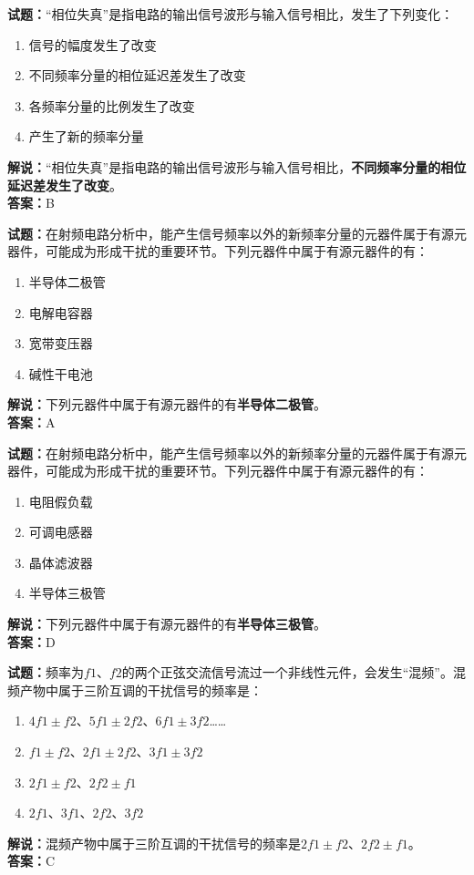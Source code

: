 \documentclass{ctexbook}
\begin{document}

\bigskip


\noindent\textbf{试题：}“相位失真”是指电路的输出信号波形与输入信号相比，发生了下列变化：
\begin{enumerate}[leftmargin=3em]
\item 信号的幅度发生了改变
\item 不同频率分量的相位延迟差发生了改变
\item 各频率分量的比例发生了改变
\item 产生了新的频率分量
\end{enumerate}
\noindent\textbf{解说：}“相位失真”是指电路的输出信号波形与输入信号相比，\textbf{不同频率分量的相位延迟差发生了改变}。\\\noindent\textbf{答案：}B



\bigskip


\noindent\textbf{试题：}在射频电路分析中，能产生信号频率以外的新频率分量的元器件属于有源元器件，可能成为形成干扰的重要环节。下列元器件中属于有源元器件的有：
\begin{enumerate}[leftmargin=3em]
\item 半导体二极管
\item 电解电容器
\item 宽带变压器
\item 碱性干电池
\end{enumerate}
\noindent\textbf{解说：}下列元器件中属于有源元器件的有\textbf{半导体二极管}。\\\noindent\textbf{答案：}A



\bigskip


\noindent\textbf{试题：}在射频电路分析中，能产生信号频率以外的新频率分量的元器件属于有源元器件，可能成为形成干扰的重要环节。下列元器件中属于有源元器件的有：
\begin{enumerate}[leftmargin=3em]
\item 电阻假负载
\item 可调电感器
\item 晶体滤波器
\item 半导体三极管
\end{enumerate}
\noindent\textbf{解说：}下列元器件中属于有源元器件的有\textbf{半导体三极管}。\\\noindent\textbf{答案：}D



\bigskip


\noindent\textbf{试题：}频率为\(f1\)、\(f2\)的两个正弦交流信号流过一个非线性元件，会发生“混频”。混频产物中属于三阶互调的干扰信号的频率是：
\begin{enumerate}[leftmargin=3em]
\item \(4f1\pm f2\)、\(5f1\pm 2f2\)、\(6f1\pm 3f2\)……
\item \(f1\pm f2\)、\(2f1\pm 2f2\)、\(3f1\pm 3f2\)
\item \(2f1\pm f2\)、\(2f2\pm f1\)
\item \(2f1\)、\(3f1\)、\(2f2\)、\(3f2\)
\end{enumerate}
\noindent\textbf{解说：}混频产物中属于三阶互调的干扰信号的频率是\(2f1\pm f2\)、\(2f2\pm f1\)。\\\noindent\textbf{答案：}C
\end{document}
